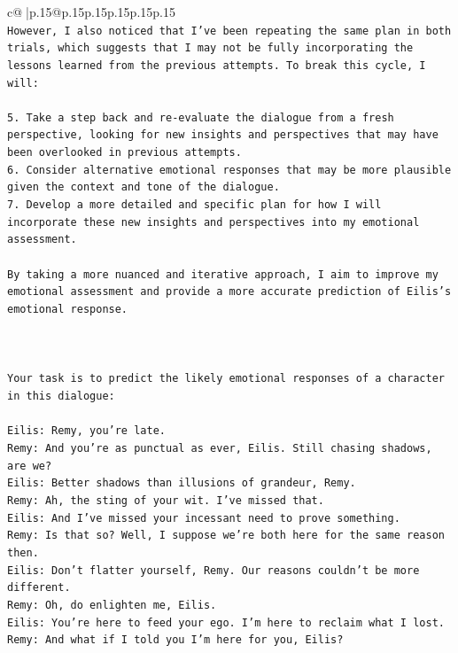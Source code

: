\documentclass{article}
\begin{document}
{\begin{supertabular}{c@{$\;$}|p{.15\linewidth}@{}p{.15\linewidth}p{.15\linewidth}p{.15\linewidth}p{.15\linewidth}p{.15\linewidth}}
{{{\\ 
\texttt{However, I also noticed that I've been repeating the same plan in both trials, which suggests that I may not be fully incorporating the lessons learned from the previous attempts. To break this cycle, I will:} \\
\\ 
\texttt{5. Take a step back and re{-}evaluate the dialogue from a fresh perspective, looking for new insights and perspectives that may have been overlooked in previous attempts.} \\
\texttt{6. Consider alternative emotional responses that may be more plausible given the context and tone of the dialogue.} \\
\texttt{7. Develop a more detailed and specific plan for how I will incorporate these new insights and perspectives into my emotional assessment.} \\
\\ 
\texttt{By taking a more nuanced and iterative approach, I aim to improve my emotional assessment and provide a more accurate prediction of Eilis's emotional response.} \\
\\ 
\\ 
\\ 
\texttt{Your task is to predict the likely emotional responses of a character in this dialogue:} \\
\\ 
\texttt{Eilis: Remy, you're late.} \\
\texttt{Remy: And you're as punctual as ever, Eilis. Still chasing shadows, are we?} \\
\texttt{Eilis: Better shadows than illusions of grandeur, Remy.} \\
\texttt{Remy: Ah, the sting of your wit. I've missed that. } \\
\texttt{Eilis: And I've missed your incessant need to prove something.} \\
\texttt{Remy: Is that so? Well, I suppose we're both here for the same reason then.} \\
\texttt{Eilis: Don't flatter yourself, Remy. Our reasons couldn't be more different.} \\
\texttt{Remy: Oh, do enlighten me, Eilis. } \\
\texttt{Eilis: You're here to feed your ego. I'm here to reclaim what I lost.} \\
\texttt{Remy: And what if I told you I'm here for you, Eilis?} \\
}}}
\end{supertabular}}
\end{document}
